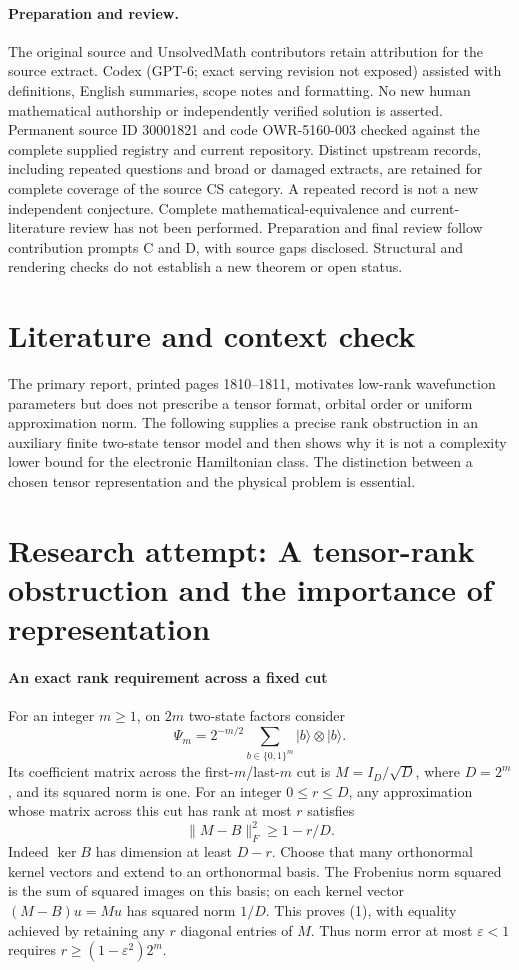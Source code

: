 \documentclass[11pt]{article}
\begin{document}
\paragraph{Preparation and review.}
The original source and UnsolvedMath contributors retain attribution for the source extract. Codex (GPT-6; exact serving revision not exposed) assisted with definitions, English summaries, scope notes and formatting. No new human mathematical authorship or independently verified solution is asserted. Permanent source ID 30001821 and code OWR-5160-003 checked against the complete supplied registry and current repository. Distinct upstream records, including repeated questions and broad or damaged extracts, are retained for complete coverage of the source CS category. A repeated record is not a new independent conjecture. Complete mathematical-equivalence and current-literature review has not been performed. Preparation and final review follow contribution prompts C and D, with source gaps disclosed. Structural and rendering checks do not establish a new theorem or open status.
\label{end:30001821}

\section{Literature and context check}
The primary report, printed pages 1810--1811, motivates low-rank wavefunction parameters but does not prescribe a tensor format, orbital order or uniform approximation norm. The following supplies a precise rank obstruction in an auxiliary finite two-state tensor model and then shows why it is not a complexity lower bound for the electronic Hamiltonian class. The distinction between a chosen tensor representation and the physical problem is essential.
\section{Research attempt: A tensor-rank obstruction and the importance of representation}

\paragraph{An exact rank requirement across a fixed cut}
For an integer $m\geq1$, on $2m$ two-state factors consider
\[
 \Psi_m=2^{-m/2}\sum_{b\in\{0,1\}^m}|b\rangle\otimes|b\rangle.
\]
Its coefficient matrix across the first-$m$/last-$m$ cut is $M=I_D/\sqrt D$, where $D=2^m$, and its squared norm is one. For an integer $0\leq r\leq D$, any approximation whose matrix across this cut has rank at most $r$ satisfies
\[
 \lVert M-B\rVert_F^2\geq1-r/D.
 \tag{1}
\]
Indeed $\ker B$ has dimension at least $D-r$. Choose that many orthonormal kernel vectors and extend to an orthonormal basis. The Frobenius norm squared is the sum of squared images on this basis; on each kernel vector $(M-B)u=Mu$ has squared norm $1/D$. This proves (1), with equality achieved by retaining any $r$ diagonal entries of $M$. Thus norm error at most $\varepsilon<1$ requires $r\geq(1-\varepsilon^2)2^m$.
\end{document}
